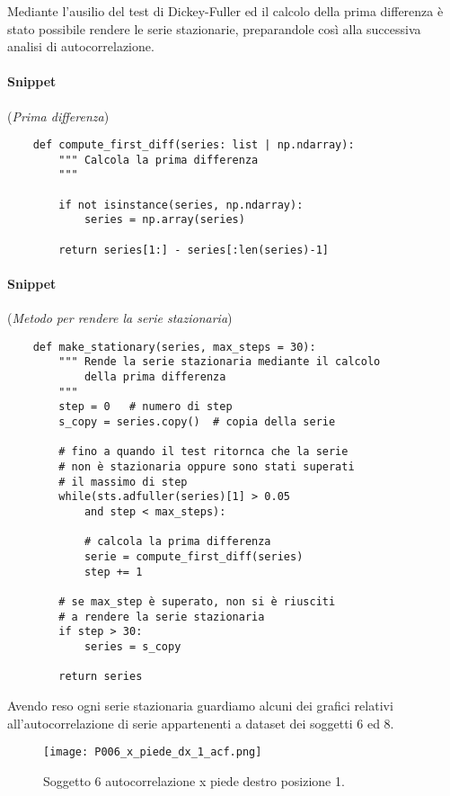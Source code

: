 Mediante l'ausilio del test di Dickey-Fuller ed il calcolo della prima differenza è stato possibile
rendere le serie stazionarie, preparandole così alla successiva analisi di autocorrelazione.
\\
\paragraph*{Snippet} (\textit{Prima differenza})
\begin{verbatim}
    def compute_first_diff(series: list | np.ndarray):
        """ Calcola la prima differenza
        """
        
        if not isinstance(series, np.ndarray):
            series = np.array(series)

        return series[1:] - series[:len(series)-1]
\end{verbatim}

\paragraph*{Snippet} (\textit{Metodo per rendere la serie stazionaria})
\begin{verbatim}
    def make_stationary(series, max_steps = 30):
        """ Rende la serie stazionaria mediante il calcolo
            della prima differenza
        """
        step = 0   # numero di step
        s_copy = series.copy()  # copia della serie
        
        # fino a quando il test ritornca che la serie
        # non è stazionaria oppure sono stati superati
        # il massimo di step
        while(sts.adfuller(series)[1] > 0.05 
            and step < max_steps):
            
            # calcola la prima differenza
            serie = compute_first_diff(series)
            step += 1

        # se max_step è superato, non si è riusciti
        # a rendere la serie stazionaria
        if step > 30:
            series = s_copy

        return series
\end{verbatim}

\begin{sloppypar}
Avendo reso ogni serie stazionaria guardiamo alcuni dei grafici relativi all'autocorrelazione
di serie appartenenti a dataset dei soggetti $6$ ed $8$.
\end{sloppypar}

\begin{figure}[H]
    \centering
    \texttt{[image: P006\_x\_piede\_dx\_1\_acf.png]}
    \caption{Soggetto $6$ autocorrelazione x piede destro posizione 1.}
    \label{fig:P006_x_piede_dx_1_acf}
\end{figure}

